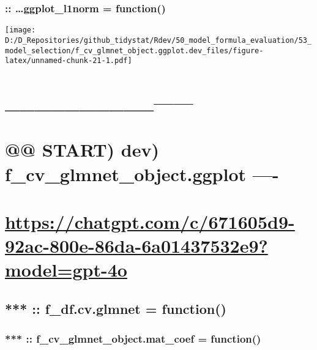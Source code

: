 \documentclass[
]{article}
\begin{document}
\hypertarget{ggplot_l1norm-function-2}{%
\subsubsection{:: \ldots ggplot\_l1norm =
function()}\label{ggplot_l1norm-function-2}}

\texttt{[image: D:/D\_Repositories/github\_tidystat/Rdev/50\_model\_formula\_evaluation/53\_model\_selection/f\_cv\_glmnet\_object.ggplot.dev\_files/figure-latex/unnamed-chunk-21-1.pdf]}

\hypertarget{section-3}{%
\section{\_\_\_\_\_\_\_\_\_\_\textbar------}\label{section-3}}

\hypertarget{start-dev-f_cv_glmnet_object.ggplot--}{%
\section{@@ START) dev) f\_cv\_glmnet\_object.ggplot
----}\label{start-dev-f_cv_glmnet_object.ggplot--}}

\hypertarget{httpschatgpt.comc671605d9-92ac-800e-86da-6a01437532e9modelgpt-4o}{%
\section{\texorpdfstring{\url{https://chatgpt.com/c/671605d9-92ac-800e-86da-6a01437532e9?model=gpt-4o}}{https://chatgpt.com/c/671605d9-92ac-800e-86da-6a01437532e9?model=gpt-4o}}\label{httpschatgpt.comc671605d9-92ac-800e-86da-6a01437532e9modelgpt-4o}}

\hypertarget{f_df.cv.glmnet-function}{%
\subsection{*** :: f\_df.cv.glmnet =
function()}\label{f_df.cv.glmnet-function}}

\hypertarget{f_cv_glmnet_object.mat_coef-function}{%
\subsubsection{*** :: f\_cv\_glmnet\_object.mat\_coef =
function()}\label{f_cv_glmnet_object.mat_coef-function}}
\end{document}
